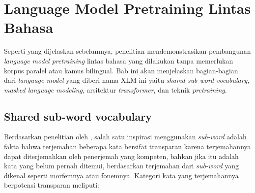 \section{Language Model Pretraining Lintas Bahasa}
    Seperti yang dijelaskan sebelumnya, penelitian \parencite{LampleConneau2019} mendemonstrasikan pembangunan \textit{language model pretraining} lintas bahasa yang dilakukan tanpa memerlukan korpus paralel atau kamus bilingual. Bab ini akan menjelaskan bagian-bagian dari \textit{language model} yang diberi nama XLM ini yaitu \textit{shared sub-word vocabulary}, \textit{masked language modeling}, arsitektur \textit{transformer}, dan teknik \textit{pretraining}.

    \subsection{Shared sub-word vocabulary}
    Berdasarkan penelitian oleh \parencite{Sennrich_Haddow_Birch_2016}, salah satu inspirasi menggunakan \textit{sub-word} adalah fakta bahwa terjemahan beberapa kata bersifat transparan karena terjemahannya dapat diterjemahkan oleh penerjemah yang kompeten, bahkan jika itu adalah kata yang belum pernah ditemui, berdasarkan terjemahan dari \textit{sub-word} yang dikenal seperti morfemnya atau fonemnya. Kategori kata yang terjemahannya berpotensi transparan meliputi:

